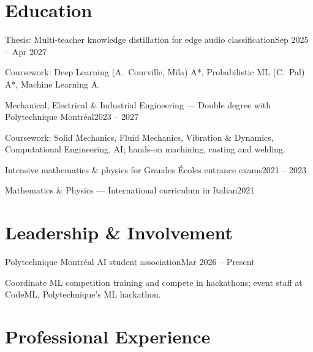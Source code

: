 \documentclass[letterpaper,10pt]{article}
\begin{document}
\section{Education}

  {Thesis: Multi-teacher knowledge distillation for edge audio classification}{Sep 2025 -- Apr 2027}
\begin{bullets}
\item Coursework: Deep Learning (A.~Courville, Mila) A*, Probabilistic ML (C.~Pal) A*, Machine Learning A.
\end{bullets}
\vspace{3pt}

  {Mechanical, Electrical \& Industrial Engineering --- Double degree with Polytechnique Montréal}{2023 -- 2027}
\begin{bullets}
  \item Coursework: Solid Mechanics, Fluid Mechanics, Vibration \& Dynamics, Computational Engineering, AI; hands-on machining, casting and welding.
\end{bullets}
\vspace{3pt}

  {Intensive mathematics \& physics for Grandes Écoles entrance exams}{2021 -- 2023}
\vspace{3pt}

  {Mathematics \& Physics --- International curriculum in Italian}{2021}
\vspace{3pt}

\section{Leadership \& Involvement}

  {Polytechnique Montréal AI student association}{Mar 2026 -- Present}
\begin{bullets}
  \item Coordinate ML competition training and compete in hackathons; event staff at CodeML, Polytechnique's ML hackathon.
\end{bullets}

\section{Professional Experience}
\end{document}
